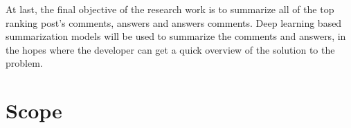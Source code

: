 At last, the final objective of the research work is to summarize all of the top ranking post's comments, answers and answers comments. Deep learning based summarization models will be used to summarize the comments and answers, in the hopes where the developer can get a quick overview of the solution to the problem.

\vspace{1cm}
\section{Scope}